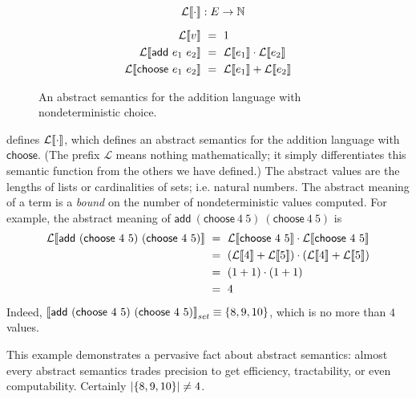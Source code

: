 \newcommand{\Count}[1]{\mathcal{L}\!\meaningof{#1}}

\begin{figure}[tb]\centering
\begin{varwidth}[b]{\textwidth}
\begin{equation*}
\begin{aligned}
	\Count{\cdot} &: E \to \Nat
	\\[6pt]
	\Count{v} &\ =\ 1 \\
	\Count{\mathsf{add}~e_1~e_2} &\ =\ \Count{e_1} \cdot \Count{e_2} \\
	\Count{\mathsf{choose}~e_1~e_2} &\ =\ \Count{e_1} + \Count{e_2}  \\
\end{aligned}
\end{equation*}
\end{varwidth}
\bottomhrule
\caption[Abstract semantics with nondeterminism]{An abstract semantics for the addition language with nondeterministic choice.}
\label{fig:add-choose-abstract}
\end{figure}

 defines $\Count{\cdot}$, which defines an abstract semantics for the addition language with $\mathsf{choose}$.
(The prefix $\mathcal{L}$ means nothing mathematically; it simply differentiates this semantic function from the others we have defined.)
The abstract values are the lengths of lists or cardinalities of sets; i.e. natural numbers.
The abstract meaning of a term is a \emph{bound} on the number of nondeterministic values computed.
For example, the abstract meaning of $\mathsf{add}~(\mathsf{choose}~4~5)~(\mathsf{choose}~4~5)$ is
\begin{equation}
\begin{aligned}
	\Count{\mathsf{add}~(\mathsf{choose}~4~5)~(\mathsf{choose}~4~5)}
	&\ =\ \Count{\mathsf{choose}~4~5} \cdot \Count{\mathsf{choose}~4~5}
\\
	&\ =\ (\Count{4} + \Count{5}) \cdot (\Count{4} + \Count{5})
\\
	&\ =\ (1 + 1) \cdot (1 + 1)
\\
	&\ =\ 4
\end{aligned}
\end{equation}
Indeed, $\left\llbracket{\mathsf{add}~(\mathsf{choose}~4~5)~(\mathsf{choose}~4~5)}\right\rrbracket_\mathit{set} \equiv \{{8,9,10}\}$, which is no more than $4$ values.

This example demonstrates a pervasive fact about abstract semantics: almost every abstract semantics trades precision to get efficiency, tractability, or even computability.
Certainly $\left|\{{8,9,10}\}\right| \neq 4$.

